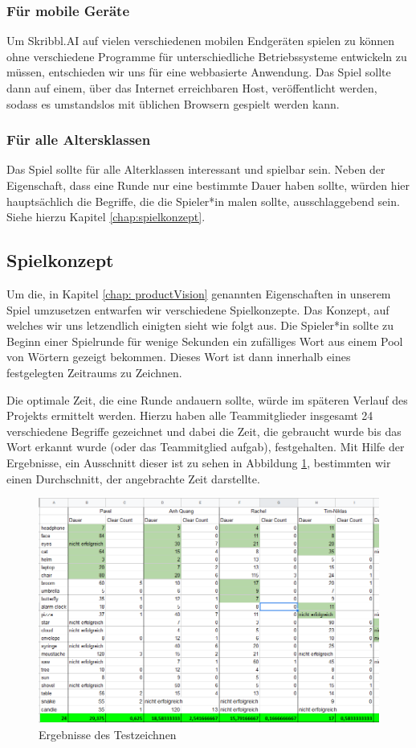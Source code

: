 \documentclass[11pt]{article}
\begin{document}
\subsubsection{Für mobile Geräte}
Um Skribbl.AI auf vielen verschiedenen mobilen Endgeräten spielen zu können ohne verschiedene Programme für unterschiedliche Betriebssysteme entwickeln zu müssen, entschieden wir uns für eine webbasierte Anwendung. Das Spiel sollte dann auf einem, über das Internet erreichbaren Host, veröffentlicht werden, sodass es umstandslos mit üblichen Browsern gespielt werden kann.
\subsubsection{Für alle Altersklassen}
Das Spiel sollte für alle Alterklassen interessant und spielbar sein. Neben der Eigenschaft, dass eine Runde nur eine bestimmte Dauer haben sollte, würden hier hauptsächlich die Begriffe, die die Spieler*in malen sollte, ausschlaggebend sein. Siehe hierzu Kapitel \ref{chap:spielkonzept}.
\subsection{Spielkonzept}
Um die, in Kapitel \ref{chap: productVision} genannten Eigenschaften in unserem Spiel umzusetzen entwarfen wir verschiedene Spielkonzepte. Das Konzept, auf welches wir uns letzendlich einigten sieht wie folgt aus.
Die Spieler*in sollte zu Beginn einer Spielrunde für wenige Sekunden ein zufälliges Wort aus einem Pool von Wörtern gezeigt bekommen. Dieses Wort ist dann innerhalb eines festgelegten Zeitraums zu Zeichnen.

Die optimale Zeit, die eine Runde andauern sollte, würde im späteren Verlauf des Projekts ermittelt werden. Hierzu haben alle Teammitglieder insgesamt 24 verschiedene Begriffe gezeichnet und dabei die Zeit, die gebraucht wurde bis das Wort erkannt wurde (oder das Teammitglied aufgab), festgehalten. Mit Hilfe der Ergebnisse, ein Ausschnitt dieser ist zu sehen in Abbildung \ref{fig:testResults}, bestimmten wir einen Durchschnitt, der angebrachte Zeit darstellte. 

\label{chap:spielkonzept}
\begin{figure}[ht]
\centering
\includegraphics[width=1\textwidth]{images/blindtesting.png}
\caption{\label{fig:testResults}Ergebnisse des Testzeichnen}
\end{figure}
\end{document}
